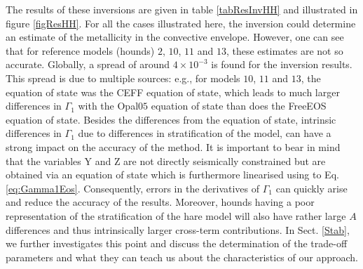 \documentclass[a4paper,fleqn,usenatbib]{mnras}
\begin{document}
The results of these inversions are given in table \ref{tabResInvHH} and illustrated in figure \ref{figResHH}. For all the cases illustrated here, the inversion could determine an estimate of the metallicity in the convective envelope. However, one can see that for reference models (hounds) $2$, $10$, $11$ and $13$, these estimates are not so accurate. Globally, a spread of around $4 \times 10^{-3}$ is found for the inversion results. This spread is due to multiple sources: e.g., for models $10$, $11$ and $13$, the equation of state was the CEFF equation of state, which leads to much larger differences in $\Gamma_{1}$ with the Opal$05$ equation of state than does the FreeEOS equation of state. Besides the differences from the equation of state, intrinsic differences in $\Gamma_{1}$ due to differences in stratification of the model, can have a strong impact on the accuracy of the method. It is important to bear in mind that the variables Y and Z are not directly seismically constrained but are obtained via an equation of state which is furthermore linearised using to Eq. \ref{eq:Gamma1Eos}. Consequently, errors in the derivatives of $\Gamma_{1}$ can quickly arise and reduce the accuracy of the results. Moreover, hounds having a poor representation of the stratification of the hare model will also have rather large $A$ differences and thus intrinsically larger cross-term contributions. In Sect. \ref{Stab}, we further investigates this point and discuss the determination of the trade-off parameters and what they can teach us about the characteristics of our approach.
\end{document}
